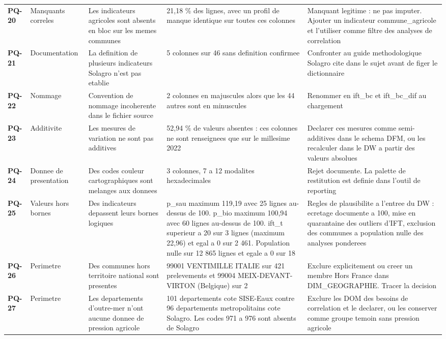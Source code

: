 {\begin{longtable}{@{}p{1.1cm}p{2.2cm}p{4.2cm}p{3.6cm}p{4.3cm}@{}}
\textbf{PQ-20} & Manquants correles & Les indicateurs agricoles sont absents en bloc sur les memes communes & 21,18 \% des lignes, avec un profil de manque identique sur toutes ces colonnes & Manquant legitime : ne pas imputer. Ajouter un indicateur commune\_agricole et l'utiliser comme filtre des analyses de correlation \\[2pt]
\textbf{PQ-21} & Documentation & La definition de plusieurs indicateurs Solagro n'est pas etablie & 5 colonnes sur 46 sans definition confirmee & Confronter au guide methodologique Solagro cite dans le sujet avant de figer le dictionnaire \\[2pt]
\textbf{PQ-22} & Nommage & Convention de nommage incoherente dans le fichier source & 2 colonnes en majuscules alors que les 44 autres sont en minuscules & Renommer en ift\_bc et ift\_bc\_dif au chargement \\[2pt]
\textbf{PQ-23} & Additivite & Les mesures de variation ne sont pas additives & 52,94 \% de valeurs absentes : ces colonnes ne sont renseignees que sur le millesime 2022 & Declarer ces mesures comme semi-additives dans le schema DFM, ou les recalculer dans le DW a partir des valeurs absolues \\[2pt]
\textbf{PQ-24} & Donnee de presentation & Des codes couleur cartographiques sont melanges aux donnees & 3 colonnes, 7 a 12 modalites hexadecimales & Rejet documente. La palette de restitution est definie dans l'outil de reporting \\[2pt]
\textbf{PQ-25} & Valeurs hors bornes & Des indicateurs depassent leurs bornes logiques & p\_sau maximum 119,19 avec 25 lignes au-dessus de 100. p\_bio maximum 100,94 avec 60 lignes au-dessus de 100. ift\_t superieur a 20 sur 3 lignes (maximum 22,96) et egal a 0 sur 2 461. Population nulle sur 12 865 lignes et egale a 0 sur 18 & Regles de plausibilite a l'entree du DW : ecretage documente a 100, mise en quarantaine des outliers d'IFT, exclusion des communes a population nulle des analyses ponderees \\[2pt]
\textbf{PQ-26} & Perimetre & Des communes hors territoire national sont presentes & 99001 VENTIMILLE ITALIE sur 421 prelevements et 99004 MEIX-DEVANT-VIRTON (Belgique) sur 2 & Exclure explicitement ou creer un membre Hors France dans DIM\_GEOGRAPHIE. Tracer la decision \\[2pt]
\textbf{PQ-27} & Perimetre & Les departements d'outre-mer n'ont aucune donnee de pression agricole & 101 departements cote SISE-Eaux contre 96 departements metropolitains cote Solagro. Les codes 971 a 976 sont absents de Solagro & Exclure les DOM des besoins de correlation et le declarer, ou les conserver comme groupe temoin sans pression agricole \\[2pt]

\end{longtable}}
